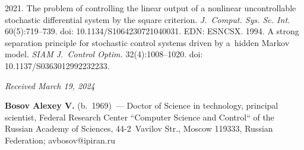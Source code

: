 \begin{multicols}{2}
{{\begin{thebibliography}{99}
       2021. The problem of controlling the linear output of a nonlinear 
uncontrollable stochastic differential system by the square criterion. \textit{J.~Comput. Sys. Sc. Int.}  
60(5):719--739. doi: 10.1134/S1064230721040031. EDN: ESNCSX.
       1994. A strong separation principle for stochastic control systems driven by 
a~hidden Markov model. \textit{SIAM J.~Control Optim.} 32(4):1008--1020. doi: 
10.1137/S0363012992232233.
      
\end{thebibliography}

 }
 }

\end{multicols}

\vspace*{-6pt}

\hfill{\small\textit{Received March 19, 2024}} 

\vspace*{-18pt}


\Contrl

\vspace*{-3pt}
      
      \noindent
      \textbf{Bosov Alexey V.} (b.\ 1969)~--- Doctor of Science in technology, principal scientist, 
Federal Research Center ``Computer Science and Control`` of the Russian Academy of Sciences,  
44-2~Vavilov Str., Moscow 119333, Russian Federation; \mbox{avbosov@ipiran.ru}

\label{end\stat}

\renewcommand{\bibname}{\protect\rm Литература} 

      